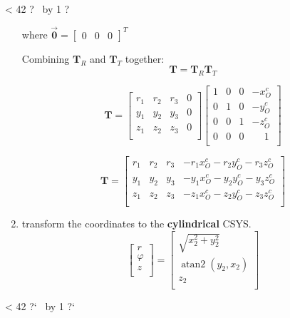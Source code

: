\documentclass[10pt,b5paper,titlepage]{book}
\newcommand{\m}{\mathbf}
\DeclareMathOperator{\atantwo}{atan2}
\newcommand{\repeatit}[3][10]{%
    \myloopcounter1%
    \loop\ifnum\myloopcounter < #1
    #2#3%
    \advance\myloopcounter by 1%
    \repeat%
    #2%
}
\newenvironment{qbox}
{
\begin{center}
    \repeatit[42]{?}{\ }
\end{center}
}
{
\begin{center}
    \repeatit[42]{?`}{\ }
\end{center}
}
\begin{document}
\begin{qbox}
\begin{enumerate}
             where $ \vec{\m{0}} = \begin{bmatrix} 0 & 0 & 0 \end{bmatrix}^T $

             Combining $ \m{T}_R $ and $ \m{T}_T $ together:
             \begin{equation}
                 \m{T} = \m{T}_R \m{T}_T
             \end{equation}

             \begin{equation}
                 \m{T} = \begin{bmatrix}
                     r_1 & r_2 & r_3 & 0 \\
                     y_1 & y_2 & y_3 & 0 \\
                     z_1 & z_2 & z_3 & 0 \\
                 \end{bmatrix}
                 \begin{bmatrix}
                     1 & 0 & 0 & -x_O^c \\
                     0 & 1 & 0 & -y_O^c \\
                     0 & 0 & 1 & -z_O^c \\
                     0 & 0 & 0 & \phantom{-}1 \\
                 \end{bmatrix}
             \end{equation}

             \begin{equation}
                 \m{T} = \begin{bmatrix}
                     r_1 & r_2 & r_3 & -r_1 x_O^c -r_2 y_O^c -r_3 z_O^c  \\
                     y_1 & y_2 & y_3 & -y_1 x_O^c -y_2 y_O^c -y_3 z_O^c  \\
                     z_1 & z_2 & z_3 & -z_1 x_O^c -z_2 y_O^c -z_3 z_O^c  \\
                 \end{bmatrix}
             \end{equation}


        \item transform the coordinates to the \textbf{cylindrical} CSYS.
            \begin{equation}
                \begin{bmatrix}
                    r \\
                    \varphi \\
                    z \\
                \end{bmatrix}
                = \begin{bmatrix}
                    \sqrt{x_2^2 + y_2^2} \\
                    \atantwo \left(y_2, x_2\right) \\
                    z_2 \\
                \end{bmatrix}
            \end{equation}


\end{enumerate}
\end{qbox}
\end{document}
